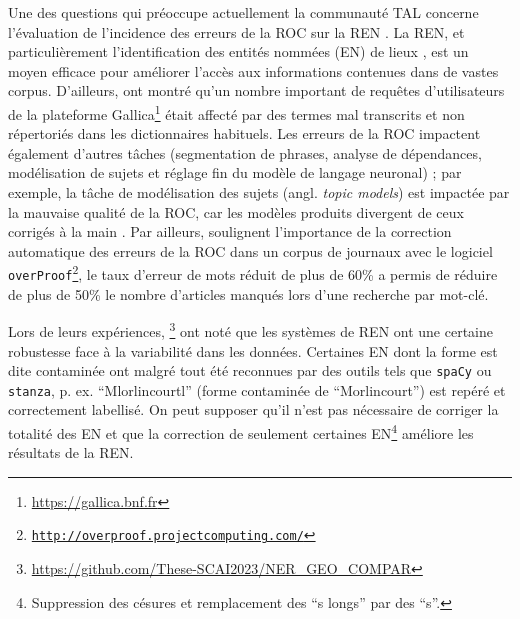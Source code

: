 Une des questions qui préoccupe actuellement la communauté TAL concerne l’évaluation de l’incidence des erreurs de la ROC sur la REN \cite{chiron:hal-03025508,hamdi:hal-03026931,DBLP:journals/corr/abs-2302-10204}. %
La REN, et particulièrement l’identification des entités nommées (EN) de lieux \cite{vanStrien-2020}, est un moyen efficace pour améliorer l’accès aux informations contenues dans de vastes corpus.
D'ailleurs,  ont montré qu'un nombre important de requêtes d'utilisateurs de la plateforme Gallica\footnote{\url{https://gallica.bnf.fr}} était affecté par des termes mal transcrits et non répertoriés dans les dictionnaires habituels. 
Les erreurs de la ROC impactent également d'autres tâches (segmentation de phrases, analyse de dépendances, modélisation de sujets et réglage fin du modèle de langage neuronal) ; par exemple, la tâche de modélisation des sujets (angl. \textit{topic models}) est impactée par la mauvaise qualité de la ROC, car les modèles produits divergent de ceux corrigés à la main \cite{vanStrien-2020}.
Par ailleurs,  soulignent l'importance de la correction automatique des erreurs de la ROC dans un corpus de journaux avec le logiciel \texttt{overProof\footnote{\url{http://overproof.projectcomputing.com/}}}, le taux d'erreur de mots réduit de plus de 60\% a permis de réduire de plus de 50\% le nombre d'articles manqués lors d'une recherche par mot-clé.

Lors de leurs expériences, \footnote{\url{https://github.com/These-SCAI2023/NER_GEO_COMPAR}} 
ont noté que les systèmes de REN ont une certaine robustesse face à la variabilité dans les données. Certaines EN dont la forme est dite \og{}contaminée\fg{} \cite{hamdi:hal-03615997} ont malgré tout été reconnues par des outils tels que \texttt{spaCy} ou \texttt{stanza}, p. ex. “Mlorlincourtl” (forme contaminée de “Morlincourt”)  est repéré et correctement labellisé. On peut supposer qu'il n'est pas nécessaire de corriger la totalité des EN et que la correction de seulement certaines EN\footnote{Suppression des césures et remplacement des ``s longs'' par des ``s''.} \cite{DBLP:conf/konvens/AlexGKT12} améliore les résultats de la REN. 

